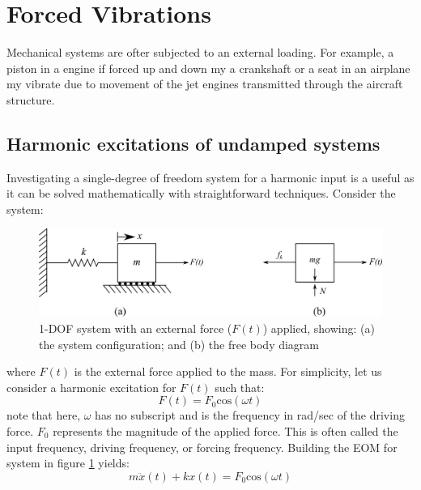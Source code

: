 \documentclass[12pt,letter]{article}
\numberwithin{ex}{section} %
\numberwithin{re}{section} %
\begin{document}
	\large{}
	
	\setcounter{section}{2}
		\section{Forced Vibrations}

			Mechanical systems are ofter subjected to an external loading. For example, a piston in a engine if forced up and down my a crankshaft or a seat in an airplane my vibrate due to movement of the jet engines transmitted through the aircraft structure. 
			
		\subsection{Harmonic excitations of undamped systems}

			
			Investigating a single-degree of freedom system for a harmonic input is a useful as it can be solved mathematically with straightforward techniques. Consider the system:
			\begin{figure}[H]
				\centering
				\includegraphics[]{../Figures/1-DOF-spring_mass_horizontal_forced_FBD.png}
				\caption{1-DOF system with an external force ($F(t)$) applied, showing: (a) the system configuration; and (b) the free body diagram}
				\label{fig:1-DOF-spring_mass_horizontal_forced_FBD}
			\end{figure}	
			\noindent where $F(t)$ is the external force applied to the mass. For simplicity, let us consider a harmonic excitation for $F(t)$ such that:
			\begin{equation}
				F(t) = F_0\text{cos}(\omega t)
			\end{equation}							
			note that here, $\omega$ has no subscript and is the frequency in rad/sec of the driving force. $F_0$ represents the magnitude of the applied force. This is often called the input frequency, driving frequency, or forcing frequency. Building the EOM for system in figure \ref{fig:1-DOF-spring_mass_horizontal_forced_FBD} yields:
			\begin{equation}
				m \ddot{x}(t)+kx(t) = F_0\text{cos}(\omega t)
			\end{equation}			
\end{document}
